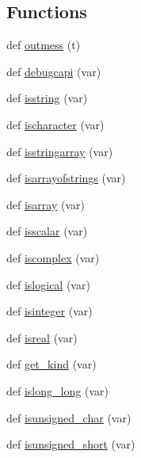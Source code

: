 \subsection*{Functions}
\begin{DoxyCompactItemize}
\item 
def \hyperlink{namespacenumpy_1_1f2py_1_1auxfuncs_ab6dbd1ceb5ee937fd19ab10e714b8922}{outmess} (t)
\item 
def \hyperlink{namespacenumpy_1_1f2py_1_1auxfuncs_a73949ae8cfc161f2f43a4e35cb9109dd}{debugcapi} (var)
\item 
def \hyperlink{namespacenumpy_1_1f2py_1_1auxfuncs_ac417f999f6d31097b5705e871ec464c8}{isstring} (var)
\item 
def \hyperlink{namespacenumpy_1_1f2py_1_1auxfuncs_aef760c7bdd0dff963c31e5f312213604}{ischaracter} (var)
\item 
def \hyperlink{namespacenumpy_1_1f2py_1_1auxfuncs_ac2f5d10ff03a34f1b402bf3cb6f91178}{isstringarray} (var)
\item 
def \hyperlink{namespacenumpy_1_1f2py_1_1auxfuncs_a2e1a66083b61c7e7e7be287acd1dbe20}{isarrayofstrings} (var)
\item 
def \hyperlink{namespacenumpy_1_1f2py_1_1auxfuncs_a82f702a25df8fff56ce390cf3cbbb7ec}{isarray} (var)
\item 
def \hyperlink{namespacenumpy_1_1f2py_1_1auxfuncs_a732c085321945b40a3703c6e14136178}{isscalar} (var)
\item 
def \hyperlink{namespacenumpy_1_1f2py_1_1auxfuncs_a82d56e896bb7b0fd9787ed961f9d1d9f}{iscomplex} (var)
\item 
def \hyperlink{namespacenumpy_1_1f2py_1_1auxfuncs_a0348e95fc94ded8127b63e601cee8330}{islogical} (var)
\item 
def \hyperlink{namespacenumpy_1_1f2py_1_1auxfuncs_a86478b6e058afe551fbb7309f157d630}{isinteger} (var)
\item 
def \hyperlink{namespacenumpy_1_1f2py_1_1auxfuncs_a1d5cb7ed1720140d528c16e4b5d872c5}{isreal} (var)
\item 
def \hyperlink{namespacenumpy_1_1f2py_1_1auxfuncs_af44ad4dd1d37debcff1c201923ebd49c}{get\+\_\+kind} (var)
\item 
def \hyperlink{namespacenumpy_1_1f2py_1_1auxfuncs_af8d4dc148d5d784a082bf3a4d2ad77b7}{islong\+\_\+long} (var)
\item 
def \hyperlink{namespacenumpy_1_1f2py_1_1auxfuncs_a9cc5e7573409de9e9f47b84de8645347}{isunsigned\+\_\+char} (var)
\item 
def \hyperlink{namespacenumpy_1_1f2py_1_1auxfuncs_a909c11fc487000703b81c331dc594deb}{isunsigned\+\_\+short} (var)

\end{DoxyCompactItemize}
